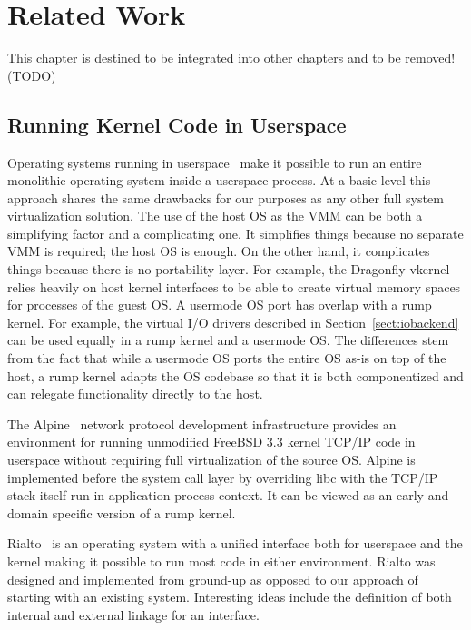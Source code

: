 
\section{Related Work}
\label{chap:related}

This chapter is destined to be integrated into other chapters and
to be removed! (TODO)

\subsection{Running Kernel Code in Userspace}

Operating systems running in userspace~\cite{dike:uml,eco:vkernel}
make it possible to run an entire monolithic operating system inside
a userspace process.  At a basic level this approach shares the
same drawbacks for our purposes as any other full system virtualization
solution.  The use of the host OS as the VMM can be both a simplifying
factor and a complicating one.  It simplifies things because no
separate VMM is required; the host OS is enough.  On the other
hand, it complicates things because there is no portability layer.
For example, the Dragonfly vkernel~\cite{eco:vkernel} relies heavily
on host kernel interfaces to be able to create virtual memory spaces
for processes of the guest OS.  A usermode OS port has overlap with
a rump kernel.  For example, the virtual I/O drivers described in
Section~\ref{sect:iobackend} can be used equally in a rump kernel
and a usermode OS.  The differences stem from the fact that while
a usermode OS ports the entire OS as-is on top of the host, a rump
kernel adapts the OS codebase so that it is both componentized and
can relegate functionality directly to the host.

The Alpine~\cite{ely:alpine} network protocol development infrastructure
provides an environment for running unmodified FreeBSD 3.3 kernel TCP/IP
code in userspace without requiring full virtualization of the source OS.
Alpine is implemented before the system call layer by overriding libc
with the TCP/IP stack itself run in application process context.  It can
be viewed as an early and domain specific version of a rump kernel.

Rialto~\cite{draves:unifying} is an operating system with a unified
interface both for userspace and the kernel making it possible to run
most code in either environment.  Rialto was designed and implemented from
ground-up as opposed to our approach of starting with an existing system.
Interesting ideas include the definition of both internal and external
linkage for an interface.

